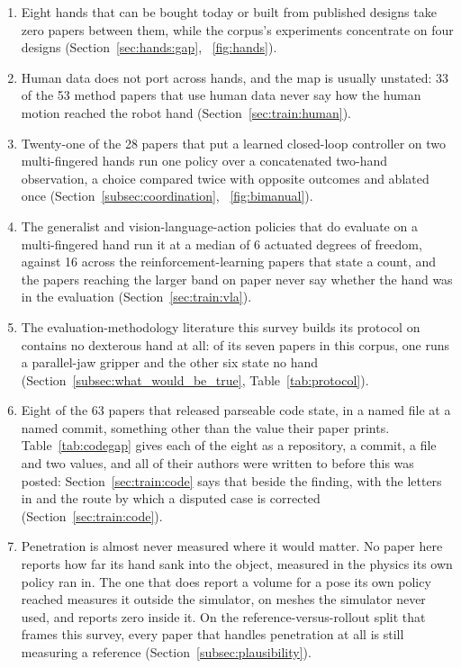 \begin{enumerate}
\item Eight hands that can be bought today or built from published designs take zero papers
between them, while the corpus's experiments concentrate on four designs
(Section~\ref{sec:hands:gap}, \figurename~\ref{fig:hands}).

\item Human data does not port across hands, and the map is usually unstated: 33 of the 53 method
papers that use human data never say how the human motion reached the robot hand
(Section~\ref{sec:train:human}).
\item Twenty-one of the 28 papers that put a learned closed-loop controller on two multi-fingered
hands run one policy over a concatenated two-hand observation, a choice compared twice with opposite
outcomes and ablated once (Section~\ref{subsec:coordination}, \figurename~\ref{fig:bimanual}).

\item The generalist and vision-language-action policies that do evaluate on a multi-fingered hand
run it at a median of 6 actuated degrees of freedom, against 16 across the reinforcement-learning
papers that state a count, and the papers reaching the larger band on paper never say whether the hand
was in the evaluation (Section~\ref{sec:train:vla}).

\item The evaluation-methodology literature this survey builds its protocol on contains no
dexterous hand at all: of its seven papers in this corpus, one runs a parallel-jaw gripper and the other six
state no hand (Section~\ref{subsec:what_would_be_true}, Table~\ref{tab:protocol}).

\item Eight of the 63 papers that released parseable code state, in a named file at a named
commit, something other than the value their paper prints.
Table~\ref{tab:codegap} gives each of the eight as a repository, a
commit, a file and two values, and all of their authors were written to before this was posted: Section~\ref{sec:train:code} says that beside the finding, with the letters in
 and the route by which a disputed case is corrected
(Section~\ref{sec:train:code}).

\item Penetration is almost never measured where it would matter. No paper here reports how far its
hand sank into the object, measured in the physics its own policy ran in. The one that does report a
volume for a pose its own policy reached measures it outside the simulator, on meshes the simulator
never used, and reports zero inside it. On the reference-versus-rollout split that frames this
survey, every paper that handles penetration at all is still measuring a reference
(Section~\ref{subsec:plausibility}).

\end{enumerate}

